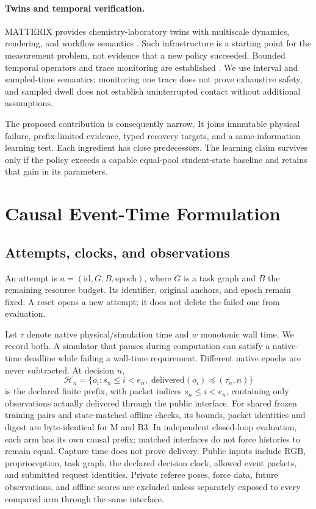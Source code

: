 \documentclass{article}
\newcommand{\Hist}{\mathcal{H}}
\begin{document}
\paragraph{Twins and temporal verification.}
MATTERIX provides chemistry-laboratory twins with multiscale dynamics, rendering, and workflow semantics \citep{darvish2026matterix}. Such infrastructure is a starting point for the measurement problem, not evidence that a new policy succeeded. Bounded temporal operators and trace monitoring are established \citep{maler2004stl}. We use interval and sampled-time semantics; monitoring one trace does not prove exhaustive safety, and sampled dwell does not establish uninterrupted contact without additional assumptions.

The proposed contribution is consequently narrow. It joins immutable physical failure, prefix-limited evidence, typed recovery targets, and a same-information learning test. Each ingredient has close predecessors. The learning claim survives only if the policy exceeds a capable equal-pool student-state baseline and retains that gain in its parameters.

\section{Causal Event-Time Formulation}
\subsection{Attempts, clocks, and observations}
An attempt is \(a=(\mathrm{id},G,B,\mathrm{epoch})\), where \(G\) is a task graph and \(B\) the remaining resource budget. Its identifier, original anchors, and epoch remain fixed. A reset opens a new attempt; it does not delete the failed one from evaluation.

Let \(\tau\) denote native physical/simulation time and \(w\) monotonic wall time. We record both. A simulator that pauses during computation can satisfy a native-time deadline while failing a wall-time requirement. Different native epochs are never subtracted. At decision \(n\),
\begin{equation}
\Hist_n=\{o_i:s_n\le i<e_n,\;\mathrm{delivered}(o_i)\preceq(\tau_n,n)\}
\label{eq:history}
\end{equation}
is the declared finite prefix, with packet indices $s_n\le i<e_n$, containing only observations actually delivered through the public interface. For shared frozen training pairs and state-matched offline checks, its bounds, packet identities and digest are byte-identical for M and B3. In independent closed-loop evaluation, each arm has its own causal prefix; matched interfaces do not force histories to remain equal. Capture time does not prove delivery. Public inputs include RGB, proprioception, task graph, the declared decision clock, allowed event packets, and submitted request identities. Private referee poses, force data, future observations, and offline scores are excluded unless separately exposed to every compared arm through the same interface.
\end{document}
